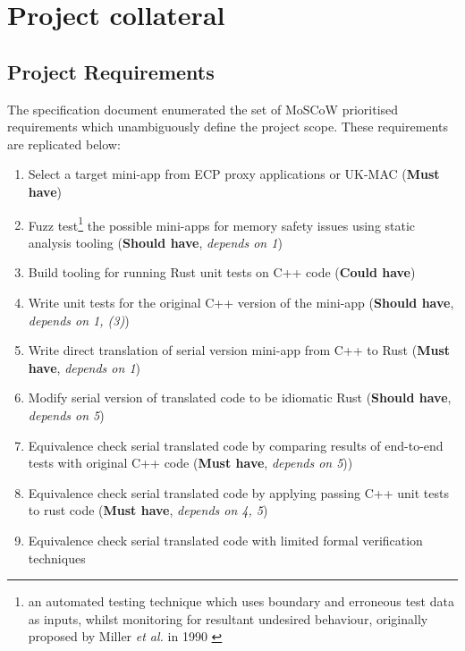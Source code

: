 \appendix

\chapter{Project collateral}
\label{ch:project-collateral}

\section{Project Requirements}
\label{sec:project-requirements}

The specification document enumerated the set of MoSCoW prioritised \cite{CaseMethodFastTrack} requirements which unambiguously define the project scope. These requirements are replicated below:

\begin{enumerate}
\item
  Select a target mini-app from ECP proxy applications or UK-MAC
  (\textbf{Must have})
\item
  Fuzz test\footnote{an automated testing technique which uses boundary and erroneous test data as inputs, whilst monitoring for resultant undesired behaviour, originally proposed by Miller \textit{et al.} in 1990 \cite{millerEmpiricalStudyReliability1990}\cite{liangFuzzingStateArt2018}} the possible mini-apps for memory safety issues using static analysis tooling \cite{stepanovMemorySanitizerFastDetector2015}
  (\textbf{Should have}, \textit{depends on 1})
\item
  Build tooling for running Rust unit tests on C++ code
  (\textbf{Could have})
\item
  Write unit tests for the original C++ version of the
  mini-app
  (\textbf{Should have}, \textit{depends on 1, (3)})
\item
  Write direct translation of serial version mini-app from C++ to Rust
  (\textbf{Must have}, \textit{depends on 1})
\item
  Modify serial version of translated code to be idiomatic Rust \cite{endlerMreIdiomaticrust2023} 
  (\textbf{Should have}, \textit{depends on 5})
\item
  Equivalence check serial translated code by comparing results of end-to-end tests with original C++ code
  (\textbf{Must have}, \textit{depends on 5}))
\item
  Equivalence check serial translated code by applying passing C++ unit tests to rust code
  (\textbf{Must have}, \textit{depends on 4, 5})
\item
  Equivalence check serial translated code with limited formal verification techniques

\end{enumerate}
